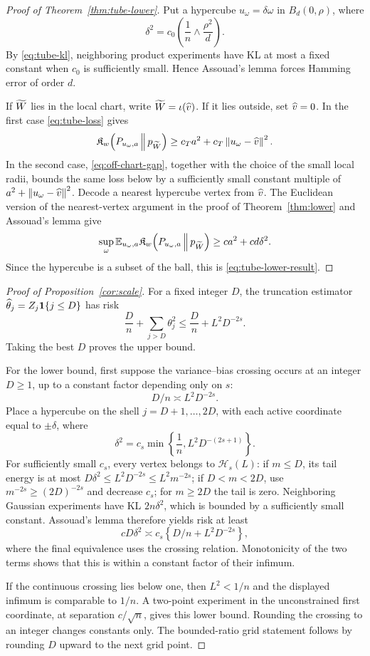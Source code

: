 \begin{proof}[Proof of Theorem~\ref{thm:tube-lower}]
Put a hypercube \(u_\omega=\delta\omega\) in \(B_d(0,\rho)\), where
\[
\delta^2=c_0\left(\frac1n\wedge\frac{\rho^2}{d}\right).
\]
By \cref{eq:tube-kl}, neighboring product experiments have KL at most a
fixed constant when \(c_0\) is sufficiently small. Hence Assouad's lemma
forces Hamming error of order \(d\).

If \(\widetilde W\) lies in the local chart, write
\(\widetilde W=\iota(\widehat v)\). If it lies outside, set \(\widehat v=0\). In the first
case \cref{eq:tube-loss} gives
\[
\mathfrak K_w\!\left(P_{u_\omega,a}\,\middle\|\,p_{\widetilde W}\right)
\ge c_Ta^2+c_T\left\lVert u_\omega-\widehat v\right\rVert^2.
\]
In the second case, \cref{eq:off-chart-gap}, together with the choice of the
small local radii, bounds the same loss below by a sufficiently small constant
multiple of \(a^2+\left\lVert u_\omega-\widehat v\right\rVert^2\). Decode a nearest hypercube
vertex from \(\widehat v\). The Euclidean version of the nearest-vertex argument
in the proof of Theorem~\ref{thm:lower} and Assouad's lemma give
\[
\sup_\omega\mathbb E_{u_\omega,a}
\mathfrak K_w\!\left(P_{u_\omega,a}\,\middle\|\,p_{\widetilde W}\right)
\ge ca^2+cd\delta^2.
\]
Since the hypercube is a subset of the ball, this is
\cref{eq:tube-lower-result}.
\end{proof}

\begin{proof}[Proof of Proposition~\ref{cor:scale}]
For a fixed integer \(D\), the truncation estimator
\(\widehat\theta_j=Z_j\mathbf 1\{j\le D\}\) has risk
\[
\frac Dn+\sum_{j>D}\theta_j^2
\le \frac Dn+L^2D^{-2s}.
\]
Taking the best \(D\) proves the upper bound.

For the lower bound, first suppose the variance--bias crossing occurs at an
integer \(D\ge1\), up to a constant factor depending only on \(s\):
\[
D/n\asymp L^2D^{-2s}.
\]
Place a hypercube on the shell \(j=D+1,\ldots,2D\), with each active
coordinate equal to \(\pm\delta\), where
\[
\delta^2=c_s\min\left\{\frac1n,
L^2D^{-(2s+1)}\right\}.
\]
For sufficiently small \(c_s\), every vertex belongs to
\(\mathcal H_s(L)\): if \(m\le D\), its tail energy is at most
\(D\delta^2\le L^2D^{-2s}\le L^2m^{-2s}\); if
\(D<m<2D\), use \(m^{-2s}\ge(2D)^{-2s}\) and decrease \(c_s\); for
\(m\ge2D\) the tail is zero. Neighboring Gaussian experiments have KL
\(2n\delta^2\), which is bounded by a sufficiently small constant.
Assouad's lemma therefore yields risk at least
\[
cD\delta^2
\asymp c_s\left\{D/n+L^2D^{-2s}\right\},
\]
where the final equivalence uses the crossing relation. Monotonicity of the
two terms shows that this is within a constant factor of their infimum.

If the continuous crossing lies below one, then \(L^2<1/n\) and the displayed
infimum is comparable to \(1/n\). A two-point experiment in the unconstrained
first coordinate, at separation \(c/\sqrt n\), gives this lower bound.
Rounding the crossing to an integer changes constants only. The bounded-ratio
grid statement follows by rounding \(D\) upward to the next grid point.
\end{proof}

